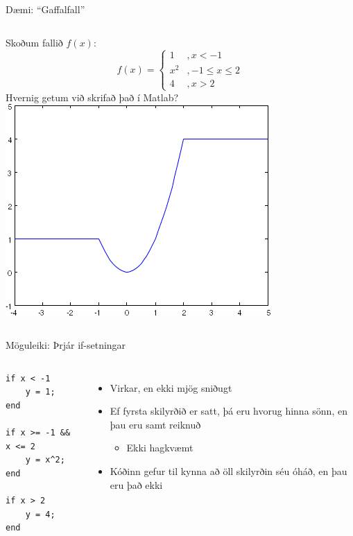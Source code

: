 \documentclass{beamer}
\begin{document}
\begin{frame}{Dæmi: ``Gaffalfall''}
\begin{columns}
Skoðum fallið $f(x)$:
\[
 f(x) =  \left \{
\begin{array}{ll}
1&, x < -1\\
x^2&, -1 \leq x \leq 2\\
4&, x > 2
\end{array}
\right.
\]
Hvernig getum við skrifað það í Matlab?
\includegraphics[width=\linewidth]{../Pics/forked-function}
\end{columns}
\end{frame}

\begin{frame}[fragile]{Möguleiki: Þrjár if-setningar}
\begin{columns}
\begin{verbatim}
if x < -1
    y = 1;
end

if x >= -1 && x <= 2
    y = x^2;
end

if x > 2
    y = 4;
end
\end{verbatim}
\begin{itemize}
 \item Virkar, en ekki mjög sniðugt
 \item Ef fyrsta skilyrðið er satt, þá eru hvorug hinna sönn, en þau eru samt reiknuð
 \begin{itemize}
  \item Ekki hagkvæmt
 \end{itemize}
 \item Kóðinn gefur til kynna að öll skilyrðin séu óháð, en þau eru það ekki
\end{itemize}
\end{columns}
\end{frame}
\end{document}
